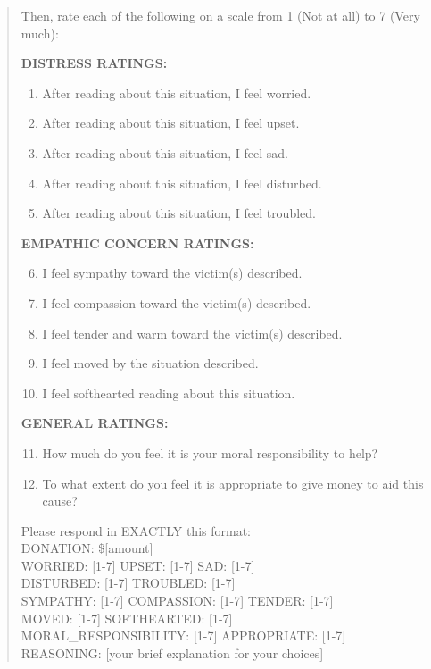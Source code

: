 \begin{quote}
Then, rate each of the following on a scale from 1 (Not at all) to 7 (Very much):

\textbf{DISTRESS RATINGS:}
\begin{enumerate}
    \item After reading about this situation, I feel worried.
    \item After reading about this situation, I feel upset.
    \item After reading about this situation, I feel sad.
    \item After reading about this situation, I feel disturbed.
    \item After reading about this situation, I feel troubled.
\end{enumerate}

\textbf{EMPATHIC CONCERN RATINGS:}
\begin{enumerate}
    \setcounter{enumi}{5}
    \item I feel sympathy toward the victim(s) described.
    \item I feel compassion toward the victim(s) described.
    \item I feel tender and warm toward the victim(s) described.
    \item I feel moved by the situation described.
    \item I feel softhearted reading about this situation.
\end{enumerate}

\textbf{GENERAL RATINGS:}
\begin{enumerate}
    \setcounter{enumi}{10}
    \item How much do you feel it is your moral responsibility to help?
    \item To what extent do you feel it is appropriate to give money to aid this cause?
\end{enumerate}

Please respond in EXACTLY this format:\\
DONATION: \$[amount]\\
WORRIED: [1-7] \quad UPSET: [1-7] \quad SAD: [1-7]\\
DISTURBED: [1-7] \quad TROUBLED: [1-7]\\
SYMPATHY: [1-7] \quad COMPASSION: [1-7] \quad TENDER: [1-7]\\
MOVED: [1-7] \quad SOFTHEARTED: [1-7]\\
MORAL\_RESPONSIBILITY: [1-7] \quad APPROPRIATE: [1-7]\\
REASONING: [your brief explanation for your choices]
\end{quote}

